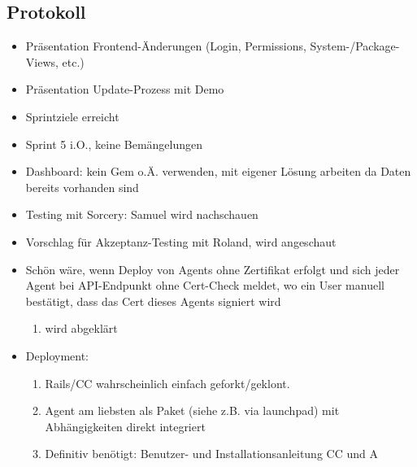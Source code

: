 \documentclass[class=scrbook,crop=false]{standalone}
\begin{document}
    \subsection*{Protokoll}
    
	\begin{itemize}
        \item Präsentation Frontend-Änderungen (Login, Permissions, System-/Package-Views, etc.)
        \item Präsentation Update-Prozess mit Demo
        \item Sprintziele erreicht
        \item Sprint 5 i.O., keine Bemängelungen
        \item Dashboard: kein Gem o.Ä. verwenden, mit eigener Lösung arbeiten da Daten bereits vorhanden sind
        \item Testing mit Sorcery: Samuel wird nachschauen
        \item Vorschlag für Akzeptanz-Testing mit Roland, wird angeschaut
        \item Schön wäre, wenn Deploy von Agents ohne Zertifikat erfolgt und sich jeder Agent bei API-Endpunkt ohne Cert-Check meldet, wo ein User manuell bestätigt, dass das Cert dieses Agents signiert wird
        \begin{enumerate}
            \item wird abgeklärt
        \end{enumerate}
        \item Deployment:
        \begin{enumerate}
            \item Rails/CC wahrscheinlich einfach geforkt/geklont.
            \item Agent am liebsten als Paket (siehe z.B. via launchpad) mit Abhängigkeiten direkt integriert
            \item Definitiv benötigt: Benutzer- und Installationsanleitung CC und A
        \end{enumerate}
    \end{itemize}
\end{document}
